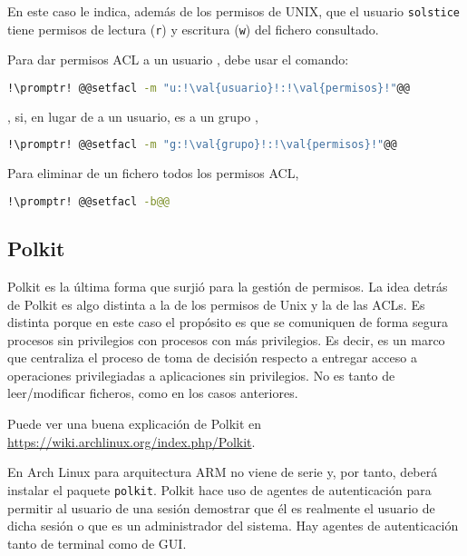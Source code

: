 \noindent En este caso le indica, además de los permisos de UNIX, que el usuario \texttt{solstice} tiene
permisos de lectura (\lstinline!r!) y escritura (\lstinline!w!) del fichero consultado.

Para dar permisos ACL a un usuario , debe usar el comando:

\begin{lstlisting}[gobble=2,language=bash,style=bashinteract,escapechar=!]
  !\promptr! @@setfacl -m "u:!\val{usuario}!:!\val{permisos}!"@@
\end{lstlisting}

\noindent, si, en lugar de a un usuario, es a un grupo ,

\begin{lstlisting}[gobble=2,language=bash,style=bashinteract,escapechar=!]
  !\promptr! @@setfacl -m "g:!\val{grupo}!:!\val{permisos}!"@@
\end{lstlisting}

\noindent Para eliminar de un fichero todos los permisos ACL,

\begin{lstlisting}[gobble=2,language=bash,style=bashinteract,escapechar=!]
  !\promptr! @@setfacl -b@@
\end{lstlisting}

\subsection{Polkit}\label{subsec:polkit}
Polkit es la última forma que surjió para la gestión de permisos. La idea detrás de Polkit es algo distinta a
la de los permisos de Unix y la de las ACLs. Es distinta porque en este caso el propósito es que se comuniquen
de forma segura procesos sin privilegios con procesos con más privilegios. Es decir, es un marco que centraliza
el proceso de toma de decisión respecto a entregar acceso a operaciones privilegiadas a aplicaciones sin
privilegios. No es tanto de leer/modificar ficheros, como en los casos anteriores.

Puede ver una buena explicación de Polkit en \url{https://wiki.archlinux.org/index.php/Polkit}.

En Arch Linux para arquitectura ARM no viene de serie y, por tanto, deberá instalar el paquete
\lstinline!polkit!. Polkit hace uso de agentes de autenticación para permitir al usuario de una sesión
demostrar que él es realmente el usuario de dicha sesión o que es un administrador del sistema. Hay agentes de
autenticación tanto de terminal como de GUI.
